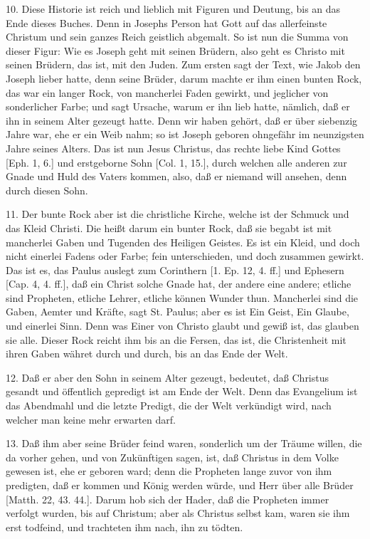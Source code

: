 10. Diese Historie ist reich und lieblich mit Figuren und Deutung, bis an das Ende dieses Buches. Denn in Josephs Person hat Gott auf das allerfeinste Christum und sein ganzes Reich geistlich abgemalt. So ist nun die Summa von dieser Figur: Wie es Joseph geht mit seinen Brüdern, also geht es Christo mit seinen Brüdern, das ist, mit den Juden. Zum ersten sagt der Text, wie Jakob den Joseph lieber hatte, denn seine Brüder, darum machte er ihm einen bunten Rock, das war ein langer Rock, von mancherlei Faden gewirkt, und jeglicher von sonderlicher Farbe; und sagt Ursache, warum er ihn lieb hatte, nämlich, daß er ihn in seinem Alter gezeugt hatte. Denn wir haben gehört, daß er über siebenzig Jahre war, ehe er ein Weib nahm; so ist Joseph geboren ohngefähr im neunzigsten Jahre seines Alters. Das ist nun Jesus Christus, das rechte liebe Kind Gottes [Eph. 1, 6.] und erstgeborne Sohn [Col. 1, 15.], durch welchen alle anderen zur Gnade und Huld des Vaters kommen, also, daß er niemand will ansehen, denn durch diesen Sohn.

11. Der bunte Rock aber ist die christliche Kirche, welche ist der Schmuck und das Kleid Christi. Die heißt darum ein bunter Rock, daß sie begabt ist mit mancherlei Gaben und Tugenden des Heiligen Geistes. Es ist ein Kleid, und doch nicht einerlei Fadens oder Farbe; fein unterschieden, und doch zusammen gewirkt. Das ist es, das Paulus auslegt zum Corinthern [1. Ep. 12, 4. ff.] und Ephesern [Cap. 4, 4. ff.], daß ein Christ solche Gnade hat, der andere eine andere; etliche sind Propheten, etliche Lehrer, etliche können Wunder thun. Mancherlei sind die Gaben, Aemter und Kräfte, sagt St. Paulus; aber es ist Ein Geist, Ein Glaube, und einerlei Sinn. Denn was Einer von Christo glaubt und gewiß ist, das glauben sie alle. Dieser Rock reicht ihm bis an die Fersen, das ist, die Christenheit mit ihren Gaben währet durch und durch, bis an das Ende der Welt.

12. Daß er aber den Sohn in seinem Alter gezeugt, bedeutet, daß Christus gesandt und öffentlich gepredigt ist am Ende der Welt. Denn das Evangelium ist das Abendmahl und die letzte Predigt, die der Welt verkündigt wird, nach welcher man keine mehr erwarten darf.

13. Daß ihm aber seine Brüder feind waren, sonderlich um der Träume willen, die da vorher
gehen, und von Zukünftigen sagen, ist, daß Christus in dem Volke gewesen ist, ehe er geboren ward; denn die Propheten lange zuvor von ihm predigten, daß er kommen und König werden würde, und Herr über alle Brüder [Matth. 22, 43. 44.]. Darum hob sich der Hader, daß die Propheten immer verfolgt wurden, bis auf Christum; aber als Christus selbst kam, waren sie ihm erst todfeind, und trachteten ihm nach, ihn zu tödten.

